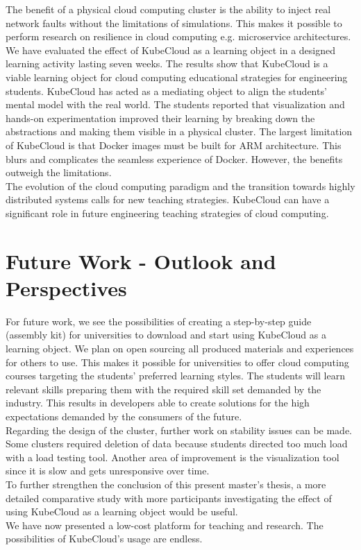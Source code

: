 \noindent
 The benefit of a physical cloud computing cluster is the ability to inject real network faults without the limitations of simulations. This makes it possible to perform research on resilience in cloud computing e.g. microservice architectures. We have evaluated the effect of KubeCloud as a learning object in a designed learning activity lasting seven weeks. The results show that KubeCloud is a viable learning object for cloud computing educational strategies for engineering students. KubeCloud has acted as a mediating object to align the students' mental model with the real world. The students reported that visualization and hands-on experimentation improved their learning by breaking down the abstractions and making them visible in a physical cluster. The largest limitation of KubeCloud is that Docker images must be built for ARM architecture. This blurs and complicates the seamless experience of Docker. However, the benefits outweigh the limitations. \\

\noindent
The evolution of the cloud computing paradigm and the transition towards highly distributed systems calls for new teaching strategies. KubeCloud can have a significant role in future engineering teaching strategies of cloud computing.



\section{Future Work - Outlook and Perspectives}
For future work, we see the possibilities of creating a step-by-step guide (assembly kit) for universities to download and start using KubeCloud as a learning object.  We plan on open sourcing all produced materials and experiences for others to use. This makes it possible for universities to offer cloud computing courses targeting the students' preferred learning styles. The students will learn relevant skills preparing them with the required skill set demanded by the industry. This results in developers able to create solutions for the high expectations demanded by the consumers of the future. \\

\noindent
Regarding the design of the cluster, further work on stability issues can be made. Some clusters required deletion of data because students directed too much load with a load testing tool. Another area of improvement is the visualization tool since it is slow and gets unresponsive over time.\\

\noindent
To further strengthen the conclusion of this present master's thesis, a more detailed comparative study with more participants investigating the effect of using KubeCloud as a learning object would be useful. \\

\noindent
We have now presented a low-cost platform for teaching and research. The possibilities of KubeCloud's usage are endless.